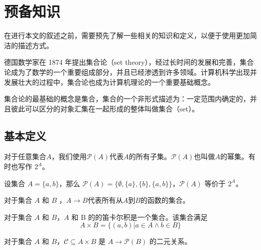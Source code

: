\chapter{预备知识}\label{cha:preliminaries}

在进行本文的叙述之前，需要预先了解一些相关的知识和定义，以便于使用更加简洁的描述方式。

德国数学家在 1874 年提出集合论（set theory），经过长时间的发展和完善，集合论成为了数学的一个重要组成部分，并且已经渗透到许多领域。计算机科学出现并发展壮大的过程中，集合论也成为计算机理论的一个重要基础概念。

集合论的最基础的概念是集合，集合的一个非形式描述为：一定范围内确定的，并且彼此可以区分的对象汇集在一起形成的整体叫做集合（set）\cite{book1}。



\section{基本定义}

\begin{definition} \label{pro:mathP}
    对于任意集合$A$，我们使用$\mathcal{P}(A)$代表$A$的所有子集。$\mathcal{P}(A)$也叫做$A$的幂集。有时也写作 $2^A$。
\end{definition}

\begin{example}[集合的幂集]
    设集合 $A=\{a,b\}$，那么 $ \mathcal{P}(A) = \{\emptyset,\{a\},\{b\},\{a,b\} \} $，$\mathcal{P}(A)$ 等价于 $2^A$。
\end{example}

\begin{definition}
    对于集合 $A$ 和 $B$ ，$A\to B$代表所有从$A$到$B$的函数的集合。
\end{definition}

\begin{definition}
    对于集合 $A$ 和 $B$，$A$ 和 B 的的笛卡尔积是一个集合。该集合满足
    \[
        A \times B = \{ (a,b) | a \in A \land b \in B \}    
    \]
\end{definition}

\begin{definition}
    对于集合 $A$ 和 $B$，$\mathcal{C} \subseteq A \times B$ 是 $A \to \mathcal{P}(B)$ 的二元关系。
\end{definition}

